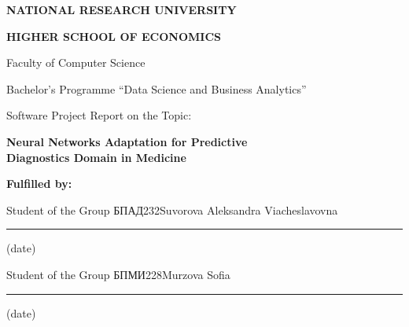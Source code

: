 \documentclass[
  american,
  a4paper,
]{article}
\author{}
\date{}
\begin{document}
\begin{titlepage}
\thispagestyle{empty}
\centering

{\Large\bfseries NATIONAL RESEARCH UNIVERSITY\par}
\vspace{0.25cm}
{\Large\bfseries HIGHER SCHOOL OF ECONOMICS\par}

\vspace{1.8cm}

{\large Faculty of Computer Science\par}
\vspace{0.3cm}
{\large Bachelor's Programme ``Data Science and Business Analytics''\par}

\vspace{2.2cm}

{\large Software Project Report on the Topic:\par}
\vspace{0.6cm}
{\LARGE\bfseries Neural Networks Adaptation for Predictive\\
Diagnostics Domain in Medicine\par}

\vspace{2.2cm}

\begin{flushleft}
\hspace{1cm}\textbf{Fulfilled by:}\par
\vspace{0.3cm}
\hspace{1cm}\begin{minipage}{0.92\textwidth}
Student of the Group БПАД232\hfill Suvorova Aleksandra Viacheslavovna\par
\vspace{0.05cm}
\hfill\rule{4cm}{0.3pt}\par
\vspace{-0.15cm}
\hfill (date)\par
\vspace{0.5cm}
Student of the Group БПМИ228\hfill Murzova Sofia\par
\vspace{0.05cm}
\hfill\rule{4cm}{0.3pt}\par
\vspace{-0.15cm}
\hfill (date)\par
\end{minipage}


\end{flushleft}
\end{titlepage}
\end{document}
